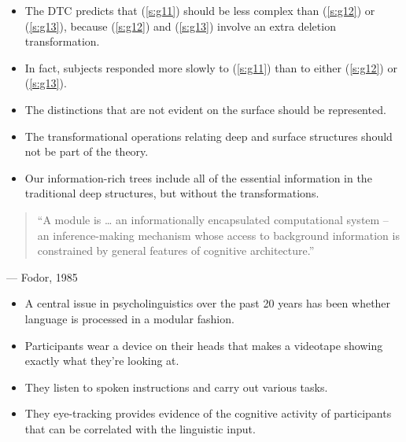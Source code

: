 \documentclass[a4paper,landscape,headrule,footrule,dvips]{foils}
\begin{document}
\begin{exe}
  \ex \label{s:g11} 
  \ex \label{s:g12} 
  \ex \label{s:g13} 
\end{exe}
\begin{itemize}
\item The DTC predicts that (\ref{s:g11}) should be less complex than
  (\ref{s:g12}) or (\ref{s:g13}), because (\ref{s:g12}) and
  (\ref{s:g13}) involve an extra deletion transformation.
\item In fact, subjects responded more slowly to (\ref{s:g11}) than to 
either (\ref{s:g12}) or (\ref{s:g13}).
\end{itemize}


\begin{itemize}
\item The  distinctions that are not evident 
on the surface should be represented.
\item The transformational operations relating deep and 
surface structures should not be part of the theory.
\item Our information-rich trees include all of the essential 
information in the traditional deep structures, but 
without the transformations.
\end{itemize}


\begin{quote}
  “A module is \ldots{} an informationally encapsulated computational system --
  an inference-making mechanism whose access to background information
  is constrained by general features of cognitive architecture.”
\end{quote}
\mbox{} \hfill --- Fodor, 1985  

\begin{itemize}
\item A central issue in psycholinguistics over the past 20 years has
  been whether language is processed in a modular fashion.
\end{itemize}



\begin{itemize}
\item Participants wear a device on their heads that makes 
a videotape showing exactly what they’re looking at.
\item They listen to spoken instructions and carry out 
various tasks. 
\item They eye-tracking provides evidence of the 
cognitive activity of participants that can be 
correlated with the linguistic input. 
\end{itemize}
\end{document}
